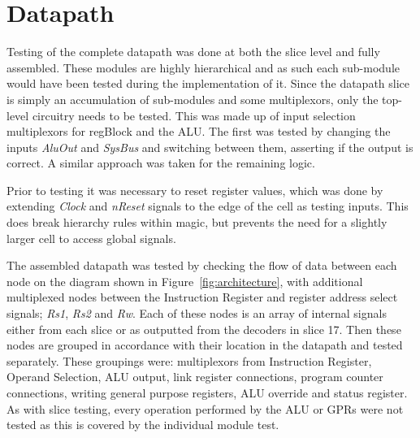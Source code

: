 
\section{Datapath}



Testing of the complete datapath was done at both the slice level and fully assembled.
These modules are highly hierarchical and as such each sub-module would have been tested during the implementation of it. 
Since the datapath slice is simply an accumulation of sub-modules and some multiplexors, only the top-level circuitry needs to be tested. 
This was made up of input selection multiplexors for regBlock and the ALU. 
The first was tested by changing the inputs \textit{AluOut} and \textit{SysBus} and switching between them, asserting if the output is correct. 
A similar approach was taken for the remaining logic.

Prior to testing it was necessary to reset register values, which was done by extending \textit{Clock} and \textit{nReset} signals to the edge of the cell as testing inputs.
This does break hierarchy rules within magic, but prevents the need for a slightly larger cell to access global signals. 

The assembled datapath was tested by checking the flow of data between each node on the diagram shown in Figure~\ref{fig:architecture}, with additional multiplexed nodes between the Instruction Register and register address select signals; \textit{Rs1}, \textit{Rs2} and \textit{Rw}.
Each of these nodes is an array of internal signals either from each slice or as outputted from the decoders in slice 17. 
Then these nodes are grouped in accordance with their location in the datapath and tested separately. 
These groupings were: multiplexors from Instruction Register, Operand Selection, ALU output, link register connections, program counter connections, writing general purpose registers, ALU override and status register. 
As with slice testing, every operation performed by the ALU or GPRs were not tested as this is covered by the individual module test. %
